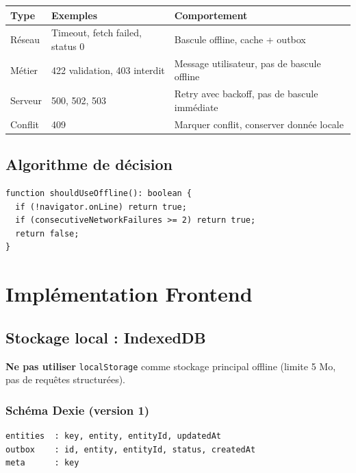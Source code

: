 \documentclass[12pt,a4paper]{report}
\begin{document}
\begin{longtable}{@{}p{3cm}p{4cm}p{6cm}@{}}
\hline
\textbf{Type} & \textbf{Exemples} & \textbf{Comportement} \\
\hline

Réseau & Timeout, fetch failed, status 0 & Bascule offline, cache + outbox \\
Métier & 422 validation, 403 interdit & Message utilisateur, pas de bascule offline \\
Serveur & 500, 502, 503 & Retry avec backoff, pas de bascule immédiate \\
Conflit & 409 & Marquer conflit, conserver donnée locale \\
\hline
\end{longtable}

\section{Algorithme de décision}

\begin{verbatim}
function shouldUseOffline(): boolean {
  if (!navigator.onLine) return true;
  if (consecutiveNetworkFailures >= 2) return true;
  return false;
}
\end{verbatim}

\chapter{Implémentation Frontend}

\section{Stockage local : IndexedDB}

\textbf{Ne pas utiliser} \texttt{localStorage} comme stockage principal offline (limite 5 Mo, pas de requêtes structurées).

\subsection{Schéma Dexie (version 1)}

\begin{verbatim}
entities  : key, entity, entityId, updatedAt
outbox    : id, entity, entityId, status, createdAt
meta      : key
\end{verbatim}
\end{document}
